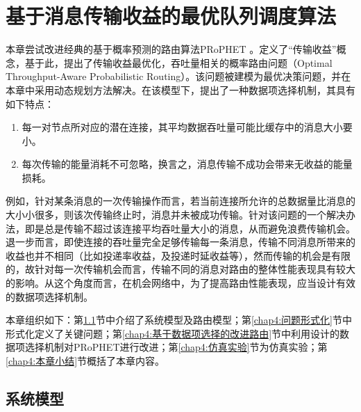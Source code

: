 \chapter{基于消息传输收益的最优队列调度算法}

本章尝试改进经典的基于概率预测的路由算法PRoPHET \cite{AndersLindgren2004}。定义了“传输收益”概念，基于此，提出了传输收益最优化，吞吐量相关的概率路由问题（Optimal Throughput-Aware Probabilistic Routing）。该问题被建模为最优决策问题，并在本章中采用动态规划方法解决。在该模型下，提出了一种数据项选择机制，其具有如下特点：
\begin{enumerate}
\item 每一对节点所对应的潜在连接，其平均数据吞吐量可能比缓存中的消息大小要小。
\item 每次传输的能量消耗不可忽略，换言之，消息传输不成功会带来无收益的能量损耗。
\end{enumerate}

例如，针对某条消息的一次传输操作而言，若当前连接所允许的总数据量比消息的大小小很多，则该次传输终止时，消息并未被成功传输。针对该问题的一个解决办法，即是总是传输不超过该连接平均吞吐量大小的消息，从而避免浪费传输机会。退一步而言，即使连接的吞吐量完全足够传输每一条消息，传输不同消息所带来的收益也并不相同（比如投递率收益，及投递时延收益等），然而传输的机会是有限的，故针对每一次传输机会而言，传输不同的消息对路由的整体性能表现具有较大的影响。从这个角度而言，在机会网络中，为了提高路由性能表现，应当设计有效的数据项选择机制。

本章组织如下：第\ref{chap4:系统模型}节中介绍了系统模型及路由模型；第\ref{chap4:问题形式化}节中形式化定义了关键问题；第\ref{chap4:基于数据项选择的改进路由}节中利用设计的数据项选择机制对PRoPHET进行改进；第\ref{chap4:仿真实验}节为仿真实验；第\ref{chap4:本章小结}节概括了本章内容。

\section{系统模型}
\label{chap4:系统模型}

